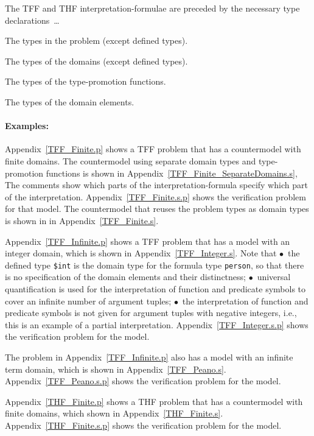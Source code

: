 \documentclass{easychair}
\newcommand{\smalltt}[1]{\small \texttt{#1}}
\newenvironment{packed_itemize}{
\vspace*{-0.3em}
\begin{itemize}
\setlength{\partopsep}{0pt}
\setlength{\itemsep}{1pt}
\setlength{\parskip}{0pt}
\setlength{\parsep}{0pt}
}{\end{itemize}}
\begin{document}
\vspace*{0.5em}
The TFF and THF interpretation-formulae are preceded by the necessary type declarations~\ldots
\begin{packed_itemize}
\item The types in the problem (except defined types).
\item The types of the domains (except defined types).
\item The types of the type-promotion functions.
\item The types of the domain elements.
\end{packed_itemize}

\paragraph{Examples:}
\begin{packed_itemize}
\item Appendix~\ref{TFF_Finite.p} shows a TFF problem that has a countermodel with finite domains.
      The countermodel using separate domain types and type-promotion functions is shown in 
      Appendix~\ref{TFF_Finite_SeparateDomains.s},
      The comments show which parts of the interpretation-formula specify which part of the 
      interpretation.
      Appendix~\ref{TFF_Finite.s.p} shows the verification problem for that model.
      The countermodel that reuses the problem types as domain types is shown in in 
      Appendix~\ref{TFF_Finite.s}.
\item Appendix~\ref{TFF_Infinite.p} shows a TFF problem that has a model with an integer domain,
      which is shown in Appendix~\ref{TFF_Integer.s}.
      Note that $\bullet$~the defined type {\smalltt{\$int}} is the domain type for the formula 
      type {\smalltt{person}}, so that there is no specification of the domain elements and their 
      distinctness; $\bullet$~universal quantification is used for the interpretation of function 
      and predicate symbols to cover an infinite number of argument tuples; $\bullet$~the 
      interpretation of function and predicate symbols is not given for argument tuples with 
      negative integers, i.e., this is an example of a partial interpretation.
      Appendix~\ref{TFF_Integer.s.p} shows the verification problem for the model.
\item The problem in Appendix~\ref{TFF_Infinite.p} also has a model with an infinite term domain,
      which is shown in Appendix~\ref{TFF_Peano.s}.
      Appendix~\ref{TFF_Peano.s.p} shows the verification problem for the model.
\item Appendix~\ref{THF_Finite.p} shows a THF problem that has a countermodel with finite domains,
      which shown in Appendix~\ref{THF_Finite.s}.
      Appendix~\ref{THF_Finite.s.p} shows the verification problem for the model.
\end{packed_itemize}
\end{document}
